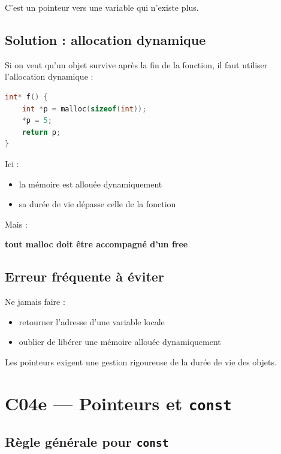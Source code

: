 C’est un pointeur vers une variable qui n’existe plus.

\subsection{Solution : allocation dynamique}

Si on veut qu’un objet survive après la fin de la fonction,
il faut utiliser l’allocation dynamique :

\begin{lstlisting}[language=C]
int* f() {
    int *p = malloc(sizeof(int));
    *p = 5;
    return p;
}
\end{lstlisting}

Ici :

\begin{itemize}
    \item la mémoire est allouée dynamiquement
    \item sa durée de vie dépasse celle de la fonction
\end{itemize}

Mais :

\begin{center}
\textbf{tout malloc doit être accompagné d’un free}
\end{center}

\subsection{Erreur fréquente à éviter}

Ne jamais faire :

\begin{itemize}
    \item retourner l’adresse d’une variable locale
    \item oublier de libérer une mémoire allouée dynamiquement
\end{itemize}

Les pointeurs exigent une gestion rigoureuse
de la durée de vie des objets.

\section{C04e — Pointeurs et \texttt{const}}

\subsection{Règle générale pour \texttt{const}}

